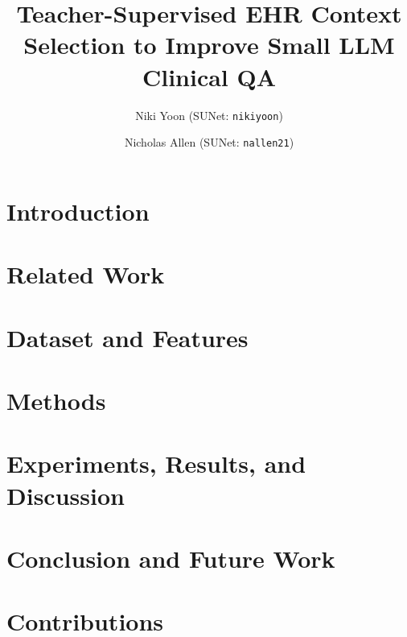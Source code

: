 \documentclass[10pt]{article}
\title{\textbf{Teacher-Supervised EHR Context Selection to Improve Small LLM Clinical QA}}
\author{
Niki Yoon (SUNet: \texttt{nikiyoon}) \and
Nicholas Allen (SUNet: \texttt{nallen21})
}
\date{}
\begin{document}
\maketitle
\vspace{-1.8em}

\begin{abstract}
\vspace{-0.4em}

\vspace{-0.4em}
\end{abstract}

\section{Introduction}


\section{Related Work}


\section{Dataset and Features}


\section{Methods}


\section{Experiments, Results, and Discussion}


\section{Conclusion and Future Work}


\section*{Contributions}




\end{document}
